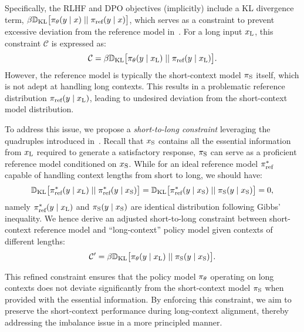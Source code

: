 Specifically, the RLHF and DPO objectives (implicitly) include a KL divergence term, $\beta\mathbb{D}_{\textrm{KL}}\bigl[\pi_\theta(y\mid x)\mid \mid \pi_{\text{ref}}(y\mid x)\bigr]$, which serves as a constraint to prevent excessive deviation from the reference model in~. For a long input $x_\text{L}$, this constraint $\mathcal{C}$ is expressed as:
\begin{equation}
\label{eq:ideal_kl}
    \mathcal{C} = \beta\mathbb{D}_{\textrm{KL}}\bigl[\pi_\theta(y\mid x_\text{L})\mid \mid \pi_{\text{ref}}(y\mid x_\text{L})\bigr].
\end{equation}
However, the reference model is typically the short-context model $\pi_\text{S}$ itself, which is not adept at handling long contexts. This results in a problematic reference distribution $\pi_{\text{ref}}(y\mid x_\text{L})$, leading to undesired deviation from the short-context model distribution.

To address this issue, we propose a \textit{short-to-long constraint} leveraging the quadruples introduced in~. Recall that $x_\text{S}$ contains all the essential information from $x_\text{L}$ required to generate a satisfactory response, $\pi_\text{S}$ can serve as a proficient reference model conditioned on $x_\text{S}$. While for an ideal reference model $\pi_{\text{ref}}^\ast$ capable of handling context lengths from short to long, we should have:
\begin{equation}
\label{eq:equal_kl}
    \mathbb{D}_{\textrm{KL}}\bigl[\pi_{\text{ref}}^\ast(y\mid x_\text{L})\mid \mid \pi_{\text{ref}}^\ast(y\mid x_\text{S})\bigr] = \mathbb{D}_{\textrm{KL}}\bigl[\pi_{\text{ref}}^\ast(y\mid x_\text{S})\mid \mid \pi_\text{S}(y\mid x_\text{S})\bigr] = 0,
\end{equation}
namely $\pi_{\text{ref}}^\ast(y\mid x_\text{L})$ and $\pi_\text{S}(y\mid x_\text{S})$ are identical distribution following Gibbs’ inequality.
We hence derive an adjusted short-to-long constraint between short-context reference model and ``long-context'' policy model given contexts of different lengths:
\begin{equation}
\label{eq:adjust_constraint}
    \mathcal{C}^\prime = \beta\mathbb{D}_{\textrm{KL}}\bigl[\pi_\theta(y\mid x_\text{L})\mid \mid \pi_\text{S}(y\mid x_\text{S})\bigr].
\end{equation}

This refined constraint ensures that the policy model $\pi_\theta$ operating on long contexts does not deviate significantly from the short-context model $\pi_\text{S}$ when provided with the essential information. By enforcing this constraint, we aim to preserve the short-context performance during long-context alignment, thereby addressing the imbalance issue in a more principled manner.

